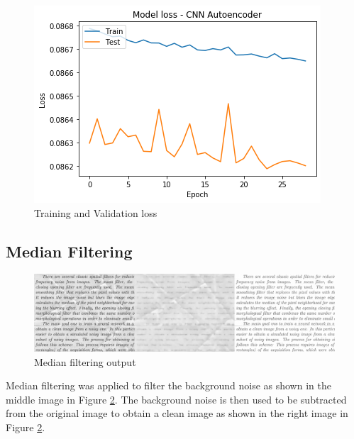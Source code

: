 \documentclass[10pt,twocolumn,letterpaper]{article}
\begin{document}
\begin{figure}[h!]
    \centering
    \includegraphics[width=\columnwidth]{images/autoencoder_loss.png}
    \caption{Training and Validation loss}
    \label{fig:autoencoderloss}
\end{figure}


\subsection{Median Filtering}
\begin{figure}[h!]
    \centering
    \includegraphics[width=\columnwidth]{images/median.png}
    \caption{Median filtering output}
    \label{fig:median}
\end{figure}
Median filtering was applied to filter the background noise as shown in the middle image in Figure \ref{fig:median}. The background noise is then used to be subtracted from the original image to obtain a clean image as shown in the right image in Figure \ref{fig:median}.
\end{document}

